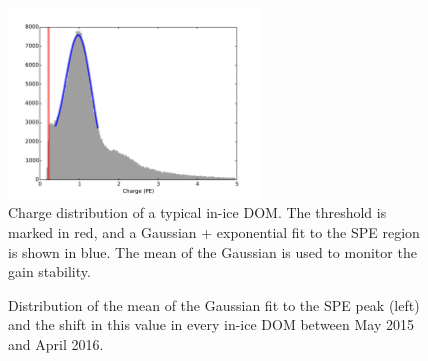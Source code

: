\begin{figure}[!h]
 \centering
 \includegraphics[width=0.6\textwidth]{graphics/dom/reliability/chargedist.pdf}
 \caption{Charge distribution of a typical in-ice DOM. The threshold
   is marked in red, and a Gaussian + exponential fit to
   the SPE region is shown in blue. The mean of the Gaussian is used
   to monitor the gain stability.}
 \label{fig:spe_fit_thresh}
\end{figure}

\begin{figure}[!h]
  \captionsetup[subfigure]{labelformat=empty}
  \centering
  \caption{Distribution of the mean of the Gaussian fit to the SPE
    peak (left) and the shift in this value in every in-ice DOM between  May 2015 and April
   2016.}
  \label{fig:gain_spe_stability}
\end{figure} 

